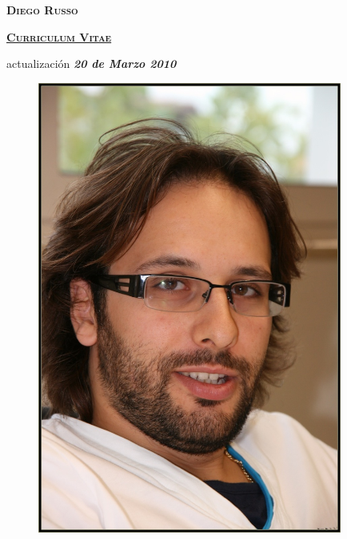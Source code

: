 \documentclass[totpages,helvetica,openbib,spanish]{europecv}
\begin{document}
    \begin{center}
        \hspace{1pt}
        \vspace{2cm}
    
        {\scshape \textbf{\Huge Diego Russo}}
    
        \vspace{1cm}
    
        {\scshape \textbf{\large \underline{Curriculum Vitae}}}
    
        \vspace{0.25cm}
    
        actualizaci\'on \emph{\textbf{20 de Marzo 2010}}
        
        \vspace{2cm}
        
        \begin{figure}[htbp] 
            \begin{center} 
                \includegraphics[width=10cm]{../images/io.jpg}
            \end{center} 
        \end{figure}
        
    \end{center}
\pagebreak
{}
\end{document}
